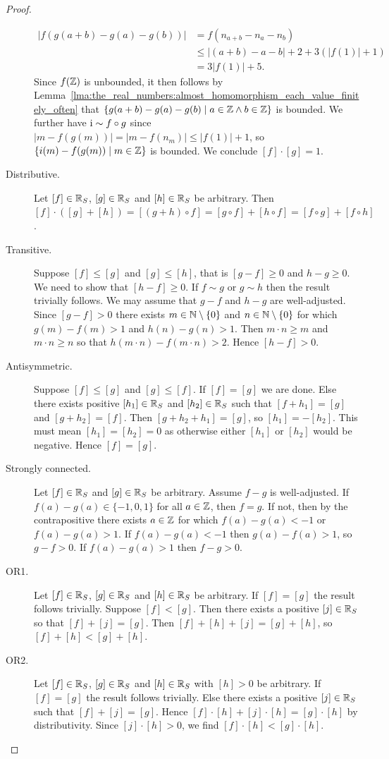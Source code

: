 \documentclass[../main.tex]{subfiles}
\begin{document}
\begin{proof}
\begin{description}
        \begin{align*}
            \vert f(g(a+b)-g(a)-g(b))\vert & =f(n_{a+b}-n_a-n_b) \\
             & \leq\vert (a+b)-a-b\vert+2+3(\vert f(1)\vert+1) \\
             & =3\vert f(1)\vert+5.
        \end{align*}
        Since $f(\mathbb{Z})$ is unbounded, it then follows by Lemma~\ref{lma:the_real_numbers:almost_homomorphism_each_value_finitely_often} that $\{g(a+b)-g(a)-g(b)\mid a\in\mathbb{Z}\land b\in\mathbb{Z}\}$ is bounded. We further have $\operatorname{i}\sim f\circ g$ since $\vert m-f(g(m))\vert=\vert m-f(n_m)\vert\leq\vert f(1)\vert+1$, so $\{i(m)-f(g(m))\mid m\in\mathbb{Z}\}$ is bounded. We conclude $[f]\cdot[g]=1$.
        \item[Distributive.] Let $[f]\in\mathbb{R}_S$, $[g]\in\mathbb{R}_S$ and $[h]\in\mathbb{R}_S$ be arbitrary. Then $[f]\cdot([g]+[h])=[(g+h)\circ f]=[g\circ f]+[h\circ f]=[f\circ g]+[f\circ h]$.
        \item[Transitive.] Suppose $[f]\leq[g]$ and $[g]\leq[h]$, that is $[g-f]\geq0$ and $h-g\geq0$. We need to show that $[h-f]\geq0$. If $f\sim g$ or $g\sim h$ then the result trivially follows. We may assume that $g-f$ and $h-g$ are well-adjusted. Since $[g-f]>0$ there exists $m\in\mathbb{N}\setminus\{0\}$ and $n\in\mathbb{N}\setminus\{0\}$ for which $g(m)-f(m)>1$ and $h(n)-g(n)>1$. Then $m\cdot n\geq m$ and $m\cdot n\geq n$ so that $h(m\cdot n)-f(m\cdot n)>2$. Hence $[h-f]>0$.
        \item[Antisymmetric.] Suppose $[f]\leq[g]$ and $[g]\leq[f]$. If $[f]=[g]$ we are done. Else there exists positive $[h_1]\in\mathbb{R}_S$ and $[h_2]\in\mathbb{R}_S$ such that $[f+h_1]=[g]$ and $[g+h_2]=[f]$. Then $[g+h_2+h_1]=[g]$, so $[h_1]=-[h_2]$. This must mean $[h_1]=[h_2]=0$ as otherwise either $[h_1]$ or $[h_2]$ would be negative. Hence $[f]=[g]$.
        \item[Strongly connected.] Let $[f]\in\mathbb{R}_S$ and $[g]\in\mathbb{R}_S$ be arbitrary. Assume $f-g$ is well-adjusted. If $f(a)-g(a)\in\{-1,0,1\}$ for all $a\in\mathbb{Z}$, then $f=g$. If not, then by the contrapositive there exists $a\in\mathbb{Z}$ for which $f(a)-g(a)<-1$ or $f(a)-g(a)>1$. If $f(a)-g(a)<-1$ then $g(a)-f(a)>1$, so $g-f>0$. If $f(a)-g(a)>1$ then $f-g>0$.
        \item[OR1.] Let $[f]\in\mathbb{R}_S$, $[g]\in\mathbb{R}_S$ and $[h]\in\mathbb{R}_S$ be arbitrary. If $[f]=[g]$ the result follows trivially. Suppose $[f]<[g]$. Then there exists a positive $[j]\in\mathbb{R}_S$ so that $[f]+[j]=[g]$. Then $[f]+[h]+[j]=[g]+[h]$, so $[f]+[h]<[g]+[h]$.
        \item[OR2.] Let $[f]\in\mathbb{R}_S$, $[g]\in\mathbb{R}_S$ and $[h]\in\mathbb{R}_S$ with $[h]>0$ be arbitrary. If $[f]=[g]$ the result follows trivially. Else there exists a positive $[j]\in\mathbb{R}_S$ such that $[f]+[j]=[g]$. Hence $[f]\cdot[h]+[j]\cdot[h]=[g]\cdot[h]$ by distributivity. Since $[j]\cdot[h]>0$, we find $[f]\cdot[h]<[g]\cdot[h]$.
    \end{description}
\end{proof}
\end{document}
